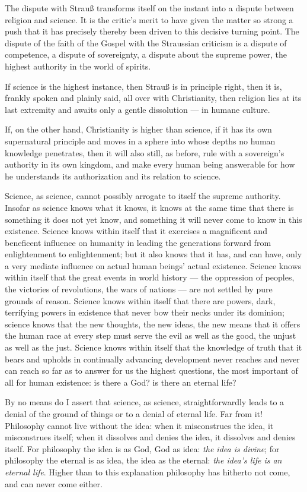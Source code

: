 \documentclass[12pt,a4paper]{book}
\begin{document}
The dispute with Strauß transforms itself on the instant into a dispute between religion
and science. It is the critic's merit to have given the matter so strong a push that it has
precisely thereby been driven to this decisive turning point. The dispute of the faith of
the Gospel with the Straussian criticism is a dispute of competence, a dispute of
sovereignty, a dispute about the supreme power, the highest authority in the world of
spirits.

If science is the highest instance, then Strauß is in principle right, then it is,
frankly spoken and plainly said, all over with
Christianity, then religion lies at its last extremity and awaits only a gentle dissolution
--- in humane culture.

If, on the other hand, Christianity is higher than science, if it has its own supernatural
principle and moves in a sphere into whose depths no human knowledge penetrates, then it
will also still, as before, rule with a sovereign's authority in its own kingdom, and make
every human being answerable for how he understands its authorization and its relation to
science.

Science, as science, cannot possibly arrogate to itself the supreme authority. Insofar as
science knows what it knows, it knows at the same time that there is something it does not
yet know, and something it will never come to know in this existence. Science knows within
itself that it exercises a magnificent and beneficent influence on humanity in leading the
generations forward from enlightenment to enlightenment; but it also knows that it has, and
can have, only a very mediate influence on actual human beings' actual existence. Science
knows within itself that the great events in world history --- the oppression of peoples,
the victories of revolutions, the wars of nations --- are not settled by pure grounds of
reason. Science knows within itself that there are powers, dark, terrifying powers in
existence that never bow their necks under its dominion; science knows that the new
thoughts, the new ideas, the new means that it offers the human race at every step must
serve the evil as well as the good, the unjust as well as the just. Science knows within
itself that the knowledge of truth that it bears and upholds in continually advancing
development never reaches and never can reach so far as to answer for us the highest
questions, the most important of all for human existence: is there a God? is there an
eternal life?

By no means do I assert that science, as science, straightforwardly leads to a denial of
the ground of things or to a denial of
eternal life. Far from it! Philosophy cannot live without the idea: when it misconstrues
the idea, it misconstrues itself; when it dissolves and denies the idea, it dissolves and
denies itself. For philosophy the idea is as God, God as idea: \emph{the idea is divine};
for philosophy the eternal is as idea, the idea as the eternal: \emph{the idea's life is an
eternal life}. Higher than to this explanation philosophy has hitherto not come, and can
never come either.
\end{document}

